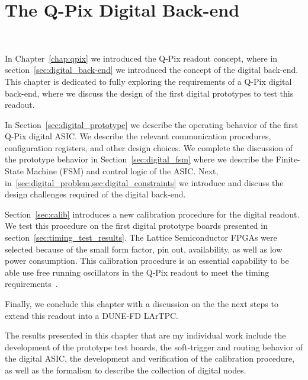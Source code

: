 \chapter{The Q-Pix Digital Back-end}~\label{chap:qdb}

In Chapter~\ref{chap:qpix} we introduced the Q-Pix readout concept, where in section~\ref{sec:digital_back-end} we introduced the concept of the digital back-end.
This chapter is dedicated to fully exploring the requirements of a Q-Pix digital back-end, where we discuss the design of the first digital prototypes to test this readout.

In Section~\ref{sec:digital_prototype} we describe the operating behavior of the first Q-Pix digital ASIC.
We describe the relevant communication procedures, configuration registers, and other design choices.
We complete the discussion of the prototype behavior in Section~\ref{sec:digital_fsm} where we describe the Finite-State Machine (FSM) and control logic of the ASIC.
Next, in~\cref{sec:digital_problem,sec:digital_constraints} we introduce and discuss the design challenges required of the digital back-end.

Section~\ref{sec:calib} introduces a new calibration procedure for the digital readout.
We test this procedure on the first digital prototype boards presented in section~\ref{sec:timing_test_results}.
The Lattice Semiconductor FPGAs \citep{lattice_ice40up_datasheet} were selected because of the small form factor, pin out, availability, as well as low power consumption.
This calibration procedure is an essential capability to be able use free running oscillators in the Q-Pix readout to meet the timing requirements~\citep{qpix:nygren:mei}.

Finally, we conclude this chapter with a discussion on the the next steps to extend this readout into a DUNE-FD LArTPC.

The results presented in this chapter that are my individual work include the development of the prototype test boards, the soft-trigger and routing behavior of the digital ASIC, the development and verification of the calibration procedure, as well as the formalism to describe the collection of digital nodes.



